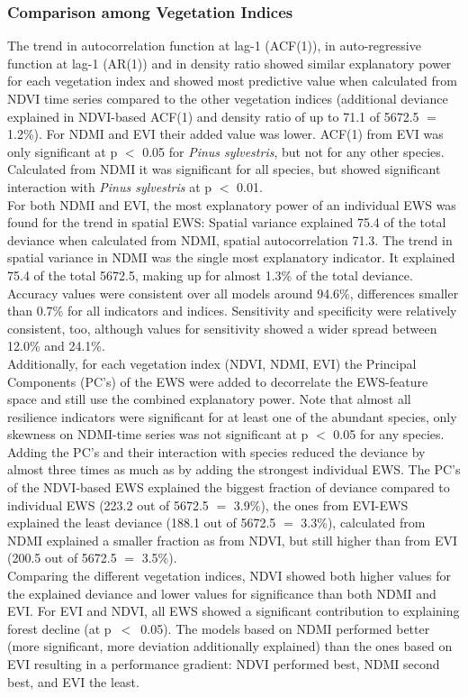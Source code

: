 \subsubsection{Comparison among Vegetation Indices}
The trend in autocorrelation function at lag-1 (ACF(1)), in auto-regressive function at lag-1 (AR(1)) and in density ratio showed similar explanatory power for each vegetation index and showed most predictive value when calculated from NDVI time series compared to the other vegetation indices (additional deviance explained in NDVI-based ACF(1) and density ratio of up to 71.1 of 5672.5 $=$ 1.2\%). For NDMI and EVI their added value was lower. ACF(1) from EVI was only significant at p $<$ 0.05 for \textit{Pinus sylvestris}, but not for any other species. Calculated from NDMI it was significant for all species, but showed significant interaction with \textit{Pinus sylvestris} at p $<$ 0.01.\\
For both NDMI and EVI, the most explanatory power of an individual EWS was found for the trend in spatial EWS: Spatial variance explained 75.4 of the total deviance when calculated from NDMI, spatial autocorrelation 71.3. The trend in spatial variance in NDMI was the single most explanatory indicator. It explained 75.4 of the total 5672.5, making up for almost 1.3\% of the total deviance. Accuracy values were consistent over all models around 94.6\%, differences smaller than 0.7\% for all indicators and indices. Sensitivity and specificity were relatively consistent, too, although values for sensitivity showed a wider spread between 12.0\% and 24.1\%.\\
Additionally, for each vegetation index (NDVI, NDMI, EVI) the Principal Components (PC's) of the EWS were added to decorrelate the EWS-feature space and still use the combined explanatory power. Note that almost all resilience indicators were significant for at least one of the abundant species, only skewness on NDMI-time series was not significant at p $<$ 0.05 for any species. Adding the PC's and their interaction with species reduced the deviance by almost three times as much as by adding the strongest individual EWS. The PC's of the NDVI-based EWS explained the biggest fraction of deviance compared to individual EWS (223.2 out of 5672.5 $=$ 3.9\%), the ones from EVI-EWS explained the least deviance (188.1 out of 5672.5 $=$ 3.3\%), calculated from NDMI explained a smaller fraction as from NDVI, but still higher than from EVI (200.5 out of 5672.5 $=$ 3.5\%).\\
Comparing the different vegetation indices, NDVI showed both higher values for the explained deviance and lower values for significance than both NDMI and EVI. For EVI and NDVI, all EWS showed a significant contribution to explaining forest decline (at p~$<$~0.05). The models based on NDMI performed better (more significant, more deviation additionally explained) than the ones based on EVI resulting in a performance gradient: NDVI performed best, NDMI second best, and EVI the least.\\

